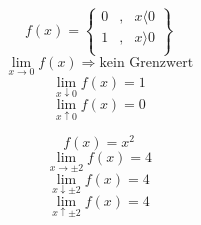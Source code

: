 \documentclass[11pt]{amsart}
\theoremstyle{remark}
\begin{document}
\begin{figure}[h]
  \centering
 \end{figure}
\begin{equation}
f(x) =\left\lbrace \begin{array}{ccc}
  0 & , & x \langle	 0\\
  1 & , & x \rangle 0\\
\end{array}\right\rbrace
\end{equation}
\begin{equation*}
\lim_{x \to 0} f(x) \Rightarrow \text{kein Grenzwert}
\end{equation*}
\begin{equation*}
\lim_{x \downarrow 0} f(x) = 1
\end{equation*}
\begin{equation*}
\lim_{x \uparrow 0} f(x) = 0
\end{equation*}
\begin{figure}[h]
  \centering
 \end{figure}\begin{equation}
f(x) = x^2
\end{equation}
\begin{equation*}
\lim_{x \to \pm2} f(x) = 4
\end{equation*}
\begin{equation*}
\lim_{x \downarrow \pm2} f(x) = 4
\end{equation*}
\begin{equation*}
\lim_{x \uparrow \pm2} f(x) = 4
\end{equation*}
\end{document}
